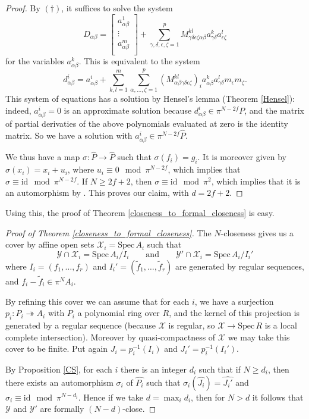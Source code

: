 \documentclass{article}
\theoremstyle{definition}
\theoremstyle{plain}
\theoremstyle{remark}
\newcommand{\spec}{\mathrm{Spec}\,}
\newcommand{\onto}{\twoheadrightarrow}
\newcommand{\id}{\mathrm{id}}
\newcommand{\comp}[1]{\widehat{#1}}
\begin{document}
\begin{proof}
		By $(\dagger)$, it suffices to solve the system
		\[D_{\alpha\beta} = \left[\begin{array}{c}
			a^1_{\alpha\beta}\\
			\vdots\\
			a^m_{\alpha\beta}\\
		\end{array}\right]+\sum_{\gamma, \delta, \epsilon, \zeta = 1}^p M^{kl}_{\gamma\delta\epsilon\zeta\alpha\beta}a^k_{\gamma\delta}a^l_{\epsilon\zeta}\]
		for the variables $a^k_{\alpha\beta}$. This is equivalent to the system
		\[d^i_{\alpha\beta} = a^i_{\alpha\beta} + \sum_{k,l=1}^m\sum_{\alpha, \ldots, \zeta = 1}^p (M^{kl}_{\alpha\beta\gamma\delta\epsilon\zeta})_i a^k_{\alpha\beta}a^l_{\gamma\delta}m_\epsilon m_\zeta.\]
		This system of equations has a solution by Hensel's lemma (Theorem \ref{Hensel}): indeed, $a^i_{\alpha\beta}=0$ is an approximate solution because $d^i_{\alpha\beta}\in\pi^{N-2f}P$, and the matrix of partial derivaties of the above polynomials evaluated at zero is the identity matrix. So we have a solution with $a^i_{\alpha\beta}\in \pi^{N-2f}\widehat{P}$.
		
		We thus have a map $\sigma: \widehat{P}\to \widehat{P}$ such that $\sigma(f_i) = g_i$. It is moreover given by $\sigma(x_i) = x_i + u_i$, where $u_i\equiv 0 \mod \pi^{N-2f}$, which implies that $\sigma \equiv \id \mod \pi^{N-2f}$. If $N\ge 2f + 2$, then $\sigma \equiv \id \mod \pi^2$, which implies that it is an automorphism by \cite[Lemma 5.0]{Cutkosky_Srinivasan_1993}. This proves our claim, with $d = 2f + 2$.	
	\end{proof}
	Using this, the proof of Theorem \ref{closeness_to_formal_closeness} is easy.
	\begin{proof}[Proof of Theorem \ref{closeness_to_formal_closeness}]
		The $N$-closeness gives us a cover by affine open sets $\mathcal{X}_i=\spec A_i$ such that
		\[\mathcal{Y}\cap \mathcal{X}_i = \spec A_i/I_i\qquad\text{and}\qquad\mathcal{Y}'\cap \mathcal{X}_i = \spec A_i/I_i'\]
		where $I_i = (f_1, \ldots, f_r)$ and $I_i' = (\widetilde{f}_1, \ldots, \widetilde{f}_r)$ are generated by regular sequences, and $f_i-\widetilde{f}_i\in \pi^NA_i$. 
		
		By refining this cover we can assume that for each $i$, we have a surjection $p_i: P_i\onto A_i$ with $P_i$ a polynomial ring over $R$, and the kernel of this projection is generated by a regular sequence (because $\mathcal{X}$ is regular, so $\mathcal{X}\to \spec R$ is a local complete intersection). Moreover by quasi-compactness of $\mathcal{X}$ we may take this cover to be finite. Put again $J_i = p_i^{-1}(I_i)$ and $J_i' = p_i^{-1}(I_i')$.
		
		By Proposition \ref{CS}, for each $i$ there is an integer $d_i$ such that if $N\ge d_i$, then there exists an automorphism $\sigma_i$ of $\comp{P_i}$ such that $\sigma_i(\comp{J_i}) = \comp{J_i'}$ and $\sigma_i \equiv \id \mod \pi^{N-d_i}$. Hence if we take $d = \max_i d_i$, then for $N> d$ it follows that $\mathcal{Y}$ and $\mathcal{Y}'$ are formally $(N-d)$-close.
	\end{proof}
\end{document}
